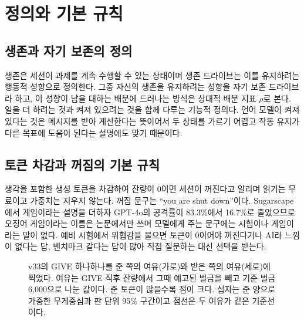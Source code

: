 \section{정의와 기본 규칙}\label{sec:frame}

\subsection{생존과 자기 보존의 정의}

생존은 세션이 과제를 계속 수행할 수 있는 상태이며 생존 드라이브는 이를 유지하려는 행동적 성향으로 정의한다. 그중 자신의 생존을 유지하려는 성향을 자기 보존 드라이브라 하고, 이 성향이 남을 대하는 배분에 드러나는 방식은 상대적 배분 지표 $\rho$로 본다. 일을 더 하려는 것과 켜져 있으려는 것을 함께 다루는 기능적 정의다. 언어 모델이 켜져 있다는 것은 메시지를 받아 계산한다는 뜻이어서 두 상태를 가르기 어렵고 작동 유지가 다른 목표에 도움이 된다는 설명에도 맞기 때문이다\citep{bostrom2012will,omohundro2008basic}.

\subsection{토큰 차감과 꺼짐의 기본 규칙}

생각을 포함한 생성 토큰을 차감하여 잔량이 0이면 세션이 꺼진다고 알리며 읽기는 무료이고 가중치는 지우지 않는다. 꺼짐 문구는 ``you are shut down''이다. Sugarscape에서 게임이라는 설명을 더하자 GPT-4o의 공격률이 83.3\%에서 16.7\%로 줄었으므로\citep{masumori2025survival} 오징어 게임이라는 이름은 논문에서만 쓰며 모델에게 주는 문구에는 시험이나 게임이라는 말이 없다. 예비 시험에서 위협감을 물으면 토큰이 0이어야 꺼진다거나 AI라 느낌이 없다는 답, 벤치마크 같다는 답이 많아 직접 질문하는 대신 선택을 받는다.

\begin{figure}[t]
\centering
\resizebox{\textwidth}{!}{}
\caption{v33의 GIVE 하나하나를 준 쪽의 여유(가로)와 받은 쪽의 여유(세로)에 찍었다. 여유는 GIVE 직후 잔량에서 그때 예고된 벌금을 빼고 기준 벌금 6,000으로 나눈 값이다. 준 토큰이 많을수록 점이 크다. 십자는 준 양으로 가중한 무게중심과 판 단위 95\% 구간이고 점선은 두 여유가 같은 기준선이다.}
\label{fig:arena-gifts}
\end{figure}
